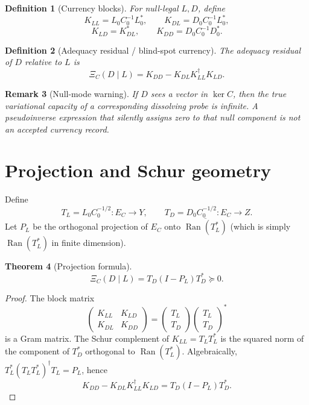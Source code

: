 \documentclass[11pt]{article}
\newtheorem{theorem}{Theorem}[section]
\newtheorem{definition}[theorem]{Definition}
\newtheorem{remark}[theorem]{Remark}
\DeclareMathOperator{\Range}{Ran}
\begin{document}
\begin{definition}[Currency blocks]
For null-legal \(L,D\), define
\[
K_{LL}=L_0C_0^{-1}L_0^*,
\qquad
K_{DL}=D_0C_0^{-1}L_0^*,
\]
\[
K_{LD}=K_{DL}^*,
\qquad
K_{DD}=D_0C_0^{-1}D_0^*.
\]
\end{definition}

\begin{definition}[Adequacy residual / blind-spot currency]
The adequacy residual of \(D\) relative to \(L\) is
\[
\boxed{
\Xi_C(D\mid L)=K_{DD}-K_{DL}K_{LL}^{\dagger}K_{LD}.
}
\]
\end{definition}

\begin{remark}[Null-mode warning]
If \(D\) sees a vector in \(\ker C\), then the true variational capacity of a
corresponding dissolving probe is infinite.  A pseudoinverse expression that
silently assigns zero to that null component is not an accepted currency record.
\end{remark}

\section{Projection and Schur geometry}
Define
\[
T_L=L_0C_0^{-1/2}:E_C\to Y,
\qquad
T_D=D_0C_0^{-1/2}:E_C\to Z.
\]
Let \(P_L\) be the orthogonal projection of \(E_C\) onto \(\overline{\Range(T_L^*)}\)
(which is simply \(\Range(T_L^*)\) in finite dimension).

\begin{theorem}[Projection formula]
\[
\boxed{
\Xi_C(D\mid L)=T_D(I-P_L)T_D^*\succeq0.
}
\]
\end{theorem}

\begin{proof}
The block matrix
\[
\begin{pmatrix}
K_{LL}&K_{LD}\\
K_{DL}&K_{DD}
\end{pmatrix}
=
\begin{pmatrix}
T_L\\ T_D
\end{pmatrix}
\begin{pmatrix}
T_L\\ T_D
\end{pmatrix}^*
\]
is a Gram matrix.  The Schur complement of \(K_{LL}=T_LT_L^*\) is the squared
norm of the component of \(T_D^*\) orthogonal to \(\Range(T_L^*)\).  Algebraically,
\(T_L^*(T_LT_L^*)^\dagger T_L=P_L\), hence
\[
K_{DD}-K_{DL}K_{LL}^\dagger K_{LD}
=T_D(I-P_L)T_D^*.
\]
\end{proof}
\end{document}
